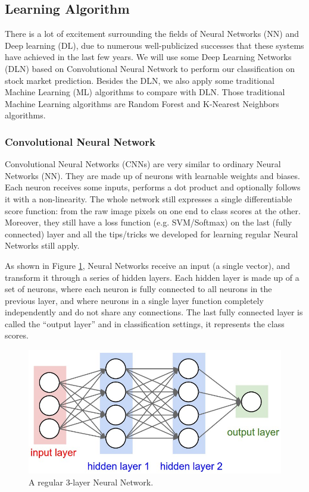\documentclass[10pt,twocolumn]{article}
\begin{document}
\subsection{Learning Algorithm}
There is a lot of excitement surrounding the fields of Neural Networks (NN) and Deep learning (DL), due to numerous well-publicized successes that these systems have achieved in the last few years. We will use some Deep Learning Networks (DLN) based on Convolutional Neural Network to perform our classification on stock market prediction. Besides the DLN, we also apply some traditional Machine Learning (ML) algorithms to compare with DLN. Those traditional Machine Learning algorithms are Random Forest and K-Nearest Neighbors algorithms.
\subsubsection{Convolutional Neural Network}
Convolutional Neural Networks (CNNs) are very similar to ordinary Neural Networks (NN). They are made up of neurons with learnable weights and biases. Each neuron receives some inputs, performs a dot product and optionally follows it with a non-linearity. The whole network still expresses a single differentiable score function: from the raw image pixels on one end to class scores at the other. Moreover, they still have a loss function (e.g. SVM/Softmax) on the last (fully connected) layer and all the tips/tricks we developed for learning regular Neural Networks still apply.
\par
As shown in Figure \ref{fig:simpleneuralnetwork}, Neural Networks receive an input (a single vector), and transform it through a series of hidden layers. Each hidden layer is made up of a set of neurons, where each neuron is fully connected to all neurons in the previous layer, and where neurons in a single layer function completely independently and do not share any connections. The last fully connected layer is called the “output layer” and in classification settings, it represents the class scores.
\begin{figure}
  \includegraphics[width=\linewidth]{figures/simpleneuralnetwork.png}
  \caption{A regular 3-layer Neural Network.}
  \label{fig:simpleneuralnetwork}
\end{figure}
\end{document}
